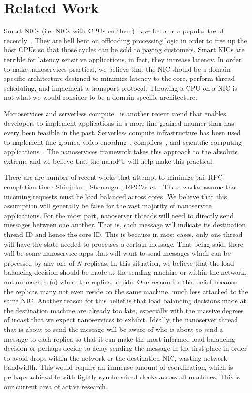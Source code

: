 \section{Related Work}
Smart NICs (i.e. NICs with CPUs on them) have become a popular trend recently~\cite{nitro, bluefield, pensando}.
They are hell bent on offloading processing logic in order to free up the host CPUs so that those cycles can be sold to paying customers.
Smart NICs are terrible for latency sensitive applications, in fact, they increase latency.
In order to make nanoservices practical, we believe that the NIC should be a domain specific architecture designed to minimize latency to the core, perform thread scheduling, and implement a transport protocol.
Throwing a CPU on a NIC is not what we would consider to be a domain specific architecture.

Microservices and serverless compute~\cite{aws-lambda, gcloud-functions, azure-functions} is another recent trend that enables developers to implement applications in a more fine grained manner than has every been feasible in the past.
Serverless compute infrastructure has been used to implement fine grained video encoding~\cite{ExCamera}, compilers~\cite{gg}, and scientific computing applications~\cite{PyWren}.
The nanoservices framework takes this approach to the absolute extreme and we believe that the nanoPU will help make this practical.

There are are number of recent works that attempt to minimize tail RPC completion time: Shinjuku~\cite{shinjuku}, Shenango~\cite{shenango}, RPCValet~\cite{rpcvalet}.
These works assume that incoming requests must be load balanced across cores.
We believe that this assumption will generally be false for the vast majority of nanoservice applications.
For the most part, nanoserver threads will need to directly send messages between one another.
That is, each message will indicate its destination thread ID and hence the core ID.
This is because in most cases, only one thread will have the state needed to processes a certain message.
That being said, there will be some nanoservice apps that will want to send messages which can be processed by any one of $N$ replicas.
In this situation, we believe that the load balancing decision should be made at the sending machine or within the network, not on machine(s) where the replicas reside.
One reason for this belief because the replicas many not even reside on the same machine, much less attached to the same NIC.
Another reason for this belief is that load balancing decisions made at the destination machine are already too late, especially with the massive degrees of incast that we expect nanoservices to exhibit.
Ideally, the nanoserver thread that is about to send the message will be aware of who is about to send a message to each replica so that it can make the most informed load balancing decision or perhaps decide to delay sending the message in the first place in order to avoid drops within the network or the destination NIC, wasting network bandwidth.
This would require an immense amount of coordination, which is perhaps achievable with tightly synchronized clocks across all machines.
This is our current area of active research.

